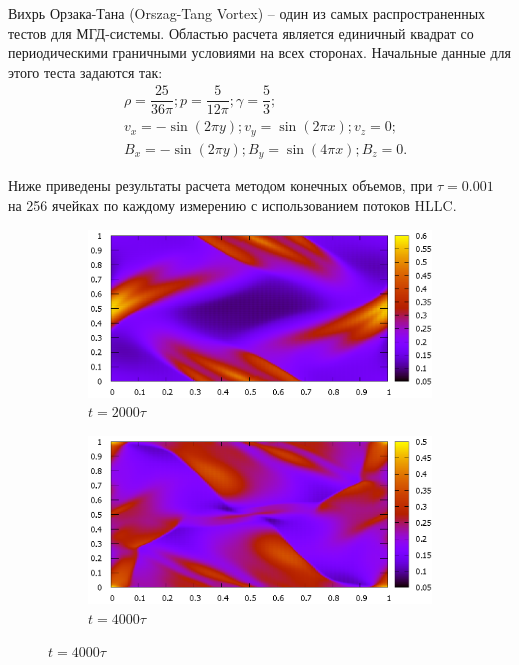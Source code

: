 \documentclass[14pt, a4paper, fleqn]{extreport}
\begin{document}
    Вихрь Орзака-Тана (Orszag-Tang Vortex) --
    один из самых распространенных тестов для МГД-системы.
    Областью расчета является единичный квадрат со периодическими 
    граничными условиями на всех сторонах.
    Начальные данные для этого теста задаются так:
    \begin{equation*}
    \begin{split}
        &\rho = \dfrac{25}{36\pi}; p = \dfrac{5}{12\pi}; \gamma = \dfrac{5}{3}; \\
        &v_x = -\sin(2\pi y); v_y = \sin(2\pi x); v_z = 0; \\
        &B_x = -\sin(2\pi y); B_y = \sin(4\pi x); B_z = 0.
    \end{split}
    \end{equation*}
    
    Ниже приведены результаты расчета методом конечных объемов,
    при $\tau = 0.001$ на 256 ячейках по каждому измерению с 
    использованием потоков HLLC.
    
    \begin{figure}[H]
        \centering
        \caption{$\rho$.}
        \begin{subfigure}{0.9\textwidth}
            \centering
            \caption{$t = 2000\tau$}
            \includegraphics[width=\textwidth]{2D_HLLC_OT_2000.eps}
        \end{subfigure}
        \begin{subfigure}{0.9\textwidth}
            \centering
            \caption{$t = 4000\tau$}
            \includegraphics[width=\textwidth]{2D_HLLC_OT_4000.eps}
        \end{subfigure}
    \end{figure}
\end{document}
